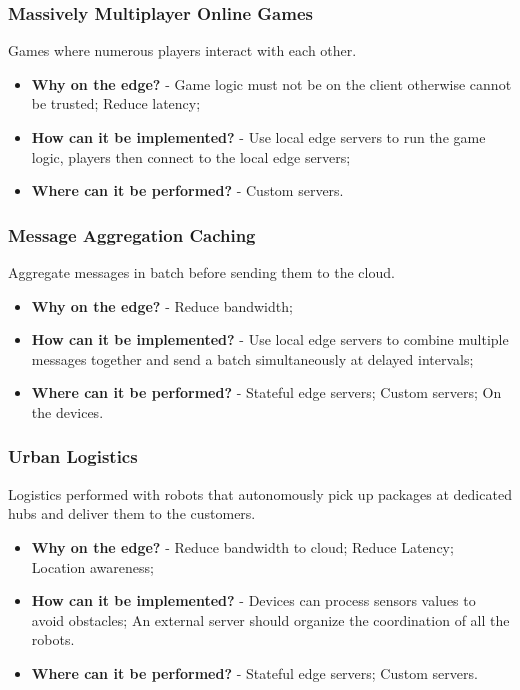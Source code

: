 \subsubsection{Massively Multiplayer Online Games}
Games where numerous players interact with each other.
\begin{itemize}
    \item \textbf{Why on the edge?} - Game logic must not be on the client otherwise cannot be trusted; Reduce latency;
    \item \textbf{How can it be implemented?} - Use local edge servers to run the game logic, players then connect to the local edge servers;
    \item \textbf{Where can it be performed?} - Custom servers.
\end{itemize}


\subsubsection{Message Aggregation Caching}
Aggregate messages in batch before sending them to the cloud.
\begin{itemize}
    \item \textbf{Why on the edge?} - Reduce bandwidth;
    \item \textbf{How can it be implemented?} - Use local edge servers to combine multiple messages together and send a batch simultaneously at delayed intervals;
    \item \textbf{Where can it be performed?} - Stateful edge servers; Custom servers; On the devices.
\end{itemize}


\subsubsection{Urban Logistics}
Logistics performed with robots that autonomously pick up packages at dedicated hubs and deliver them to the customers.
\begin{itemize}
    \item \textbf{Why on the edge?} - Reduce bandwidth to cloud; Reduce Latency; Location awareness;
    \item \textbf{How can it be implemented?} - Devices can process sensors values to avoid obstacles; An external server should organize the coordination of all the robots.
    \item \textbf{Where can it be performed?} - Stateful edge servers; Custom servers.
\end{itemize}


